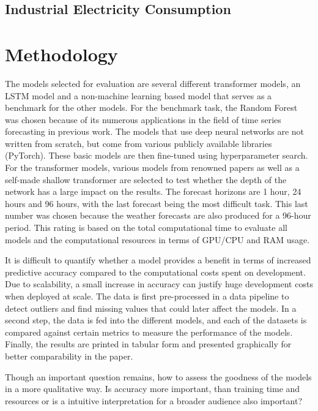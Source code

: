 \documentclass{article}
\begin{document}
\subsection{Industrial Electricity Consumption}






\section{Methodology}

The models selected for evaluation are several different transformer models, an LSTM model and a non-machine learning based model that serves as a benchmark for the other models. For the benchmark task, the Random Forest was chosen because of its numerous applications in the field of time series forecasting in previous work. The models that use deep neural networks are not written from scratch, but come from various publicly available libraries (PyTorch). These basic models are then fine-tuned using hyperparameter search. For the transformer models, various models from renowned papers as well as a self-made shallow transformer are selected to test whether the depth of the network has a large impact on the results. The forecast horizons are 1 hour, 24 hours and 96 hours, with the last forecast being the most difficult task. This last number was chosen because the weather forecasts are also produced for a 96-hour period. This rating is based on the total computational time to evaluate all models and the computational resources in terms of GPU/CPU and RAM usage.\par 

It is difficult to quantify whether a model provides a benefit in terms of increased predictive accuracy compared to the computational costs spent on development. Due to scalability, a small increase in accuracy can justify huge development costs when deployed at scale. The data is first pre-processed in a data pipeline to detect outliers and find missing values that could later affect the models. In a second step, the data is fed into the different models, and each of the datasets is compared against certain metrics to measure the performance of the models. Finally, the results are printed in tabular form and presented graphically for better comparability in the paper. \par 
Though an important question remains, how to assess the goodness of the models in a more qualitative way. Is accuracy more important, than training time and resources or is a intuitive interpretation for a broader audience also important?
\end{document}
